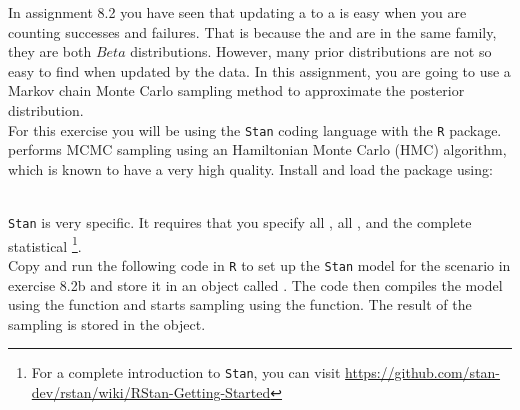 \setcounter{section}{8}
\setcounter{subsection}{3}
\setcounter{question}{0}



In assignment 8.2 you have seen that updating a  to a  is easy when you are counting successes and failures. That is because the  and  are in the same family, they are both $Beta$ distributions. However, many prior distributions are not so easy to find when updated by the data. In this assignment, you are going to use a Markov chain Monte Carlo sampling method to approximate the posterior distribution. \\

For this exercise you will be using the \texttt{Stan} coding language with the  \texttt{R} package.  performs MCMC sampling using an Hamiltonian Monte Carlo (HMC) algorithm, which is known to have a very high quality. Install and load the package using: \\
\\

\texttt{Stan} is very specific. It requires that you specify all , all , and the complete statistical \footnote{For a complete introduction to \texttt{Stan}, you can visit \url{https://github.com/stan-dev/rstan/wiki/RStan-Getting-Started}}. \\

Copy and run the following code in \texttt{R} to set up the \texttt{Stan} model for the scenario in exercise 8.2b and store it in an object called . The code then compiles the model using the  function and starts sampling using the  function. The result of the sampling is stored in the  object. \\


